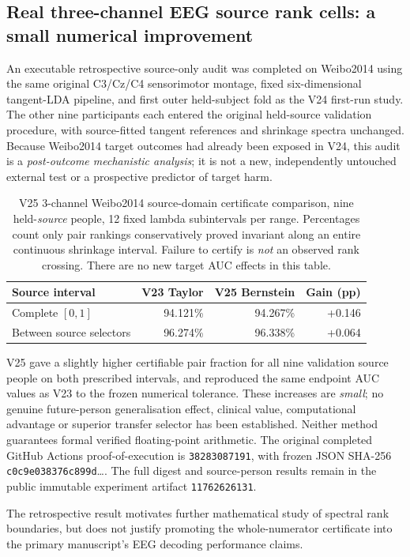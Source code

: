 \subsection{Real three-channel EEG source rank cells: a small numerical improvement}
\label{sec:v25-real-bernstein}
An executable retrospective source-only audit was completed on
Weibo2014 using the same original C3/Cz/C4 sensorimotor montage,
fixed six-dimensional tangent-LDA pipeline, and first outer
held-subject fold as the V24 first-run study. The other nine
participants each entered the original held-source validation
procedure, with source-fitted tangent references and shrinkage
spectra unchanged. Because Weibo2014 target outcomes had already
been exposed in V24, this audit is a \emph{post-outcome
mechanistic analysis}; it is not a new, independently untouched
external test or a prospective predictor of target harm.

\begin{table}[tb]
\centering\small
\caption{V25 3-channel Weibo2014 source-domain certificate
comparison, nine held-\emph{source} people, 12 fixed lambda
subintervals per range. Percentages count only pair rankings
conservatively proved invariant along an entire continuous
shrinkage interval. Failure to certify is \emph{not} an
observed rank crossing. There are no new target AUC effects
in this table.}
\label{tab:v25-source-bernstein}
\begin{tabular}{lrrr}
\toprule
Source interval & V23 Taylor & V25 Bernstein & Gain (pp)\\
\midrule
Complete $[0,1]$ & 94.121\% & 94.267\% & +0.146\\
Between source selectors & 96.274\% & 96.338\% & +0.064\\
\bottomrule
\end{tabular}
\end{table}

V25 gave a slightly higher certifiable pair fraction for
all nine validation source people on both prescribed
intervals, and reproduced the same endpoint AUC values
as V23 to the frozen numerical tolerance. These
increases are \emph{small}; no genuine future-person
generalisation effect, clinical value, computational
advantage or superior transfer selector has been
established. Neither method guarantees formal verified
floating-point arithmetic. The original completed
GitHub Actions proof-of-execution is
\texttt{38283087191}, with frozen JSON SHA-256
\texttt{c0c9e038376c899d}\ldots.
The full digest and source-person results remain in
the public immutable experiment artifact
\texttt{11762626131}.

The retrospective result motivates further mathematical
study of spectral rank boundaries, but does not justify
promoting the whole-numerator certificate into the
primary manuscript's EEG decoding performance claims.
